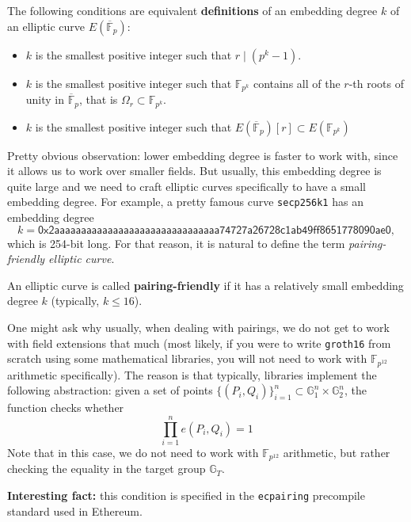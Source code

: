 \documentclass[../lecture-notes.tex]{subfiles}
\begin{document}
\begin{definition}
    The following conditions are equivalent \textbf{definitions} of an embedding degree $k$ of an elliptic curve $E(\overline{\mathbb{F}}_p)$:
    \begin{itemize}
        \item $k$ is the smallest positive integer such that $r \mid (p^k-1)$.
        \item $k$ is the smallest positive integer such that $\mathbb{F}_{p^k}$ contains all of the $r$-th roots of unity in $\overline{\mathbb{F}}_p$, that is $\Omega_r \subset \mathbb{F}_{p^k}$.
        \item $k$ is the smallest positive integer such that $E(\overline{\mathbb{F}}_p)[r] \subset E(\mathbb{F}_{p^k})$
    \end{itemize}
\end{definition}

Pretty obvious observation: lower embedding degree is faster to work with, since it allows us to work over smaller fields. But usually, this embedding degree is quite large and we need to craft elliptic curves specifically to have a small embedding degree. For example, a pretty famous curve \texttt{secp256k1} has an embedding degree
\begin{equation*}
    k = \mathsf{0x2aaaaaaaaaaaaaaaaaaaaaaaaaaaaaaa74727a26728c1ab49ff8651778090ae0},
\end{equation*}
which is 254-bit long. For that reason, it is natural to define the term \textit{pairing-friendly elliptic curve}.
\begin{definition}
    An elliptic curve is called \textbf{pairing-friendly} if it has a relatively small embedding degree $k$ (typically, $k \leq 16$).
\end{definition}

\begin{remark}
    One might ask why usually, when dealing with pairings, we do not get to work with field extensions that much (most likely, if you were to write \texttt{groth16} from scratch using some mathematical libraries, you will not need to work with $\mathbb{F}_{p^{12}}$ arithmetic specifically). The reason is that typically, libraries implement the following abstraction: given a set of points $\{(P_i,Q_i)\}_{i=1}^n \subset \mathbb{G}_1^n \times \mathbb{G}_2^n$, the function checks whether
    \begin{equation}
        \prod_{i=1}^n e(P_i,Q_i) = 1
    \end{equation}
    Note that in this case, we do not need to work with $\mathbb{F}_{p^{12}}$ arithmetic, but rather checking the equality in the target group $\mathbb{G}_T$. 

    \textbf{Interesting fact:} this condition is specified in the \texttt{ecpairing} precompile standard used in Ethereum.
\end{remark}
\end{document}
